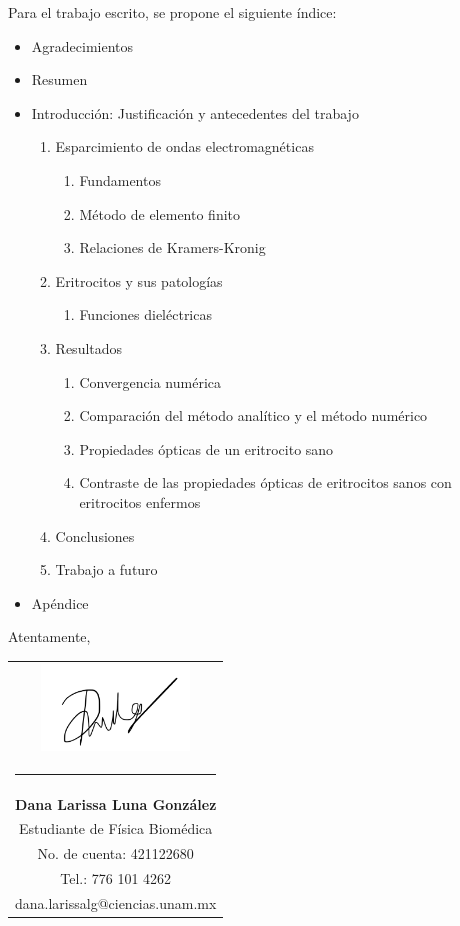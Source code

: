 \documentclass[11pt,letterpaper]{article}
\begin{document}
	Para el trabajo escrito, se propone el siguiente índice:
	\begin{itemize}
		\item  Agradecimientos
		\item  Resumen
		\item  Introducción: Justificación y antecedentes del trabajo
		\begin{enumerate}
			\item Esparcimiento de ondas electromagnéticas
			\begin{enumerate}
				\item Fundamentos
				\item Método de elemento finito
				\item Relaciones de Kramers-Kronig
			\end{enumerate}
			\item Eritrocitos y sus patologías
			\begin{enumerate}
				\item Funciones dieléctricas
			\end{enumerate}
			\item Resultados
			\begin{enumerate}
				\item Convergencia numérica
				\item Comparación del método analítico y el método numérico
				\item Propiedades ópticas de un eritrocito sano
				\item  Contraste de las propiedades ópticas de eritrocitos sanos con eritrocitos enfermos
			\end{enumerate}
			\item Conclusiones
			\item Trabajo a futuro	
		\end{enumerate}
		\item Apéndice		
	\end{itemize}
	\newpage
	Atentamente,
	
	\vspace{1cm}
	{\hspace{0.7cm}\begin{tabular}{c}
		\includegraphics[height=2.3cm]{firma}\\[-0.5cm] %
		\rule{5.5cm}{0.4pt} \\[0.2cm]
		\textbf{Dana Larissa Luna González} \\
		Estudiante de Física Biomédica \\
		No. de cuenta: 421122680 \\
		Tel.: 776 101 4262 \\
		dana.larissalg@ciencias.unam.mx \\
	\end{tabular}}
\end{document}
